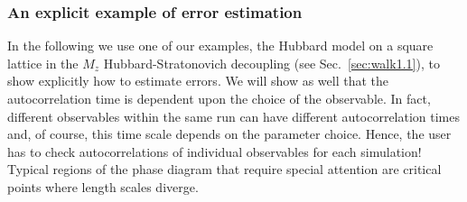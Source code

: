 %
\subsubsection{An explicit example of error estimation}\label{sec:autocorr}
%
In the following we use one of our examples, the Hubbard model on a square lattice in the $M_z$ Hubbard-Stratonovich decoupling (see Sec.~\ref{sec:walk1.1}), to show explicitly how to estimate errors.  We will show as well that the  autocorrelation time is dependent upon the  choice of the observable.  In fact, different observables within the same run can have different autocorrelation times and, of course, this time scale depends on the  parameter choice.  Hence, the user has to check  autocorrelations of individual observables for each simulation!  Typical regions of the phase diagram that require special attention are critical points  where length scales diverge.  

